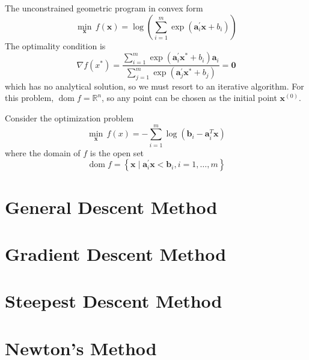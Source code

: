 \begin{example}
    The unconstrained geometric program in convex form
    \begin{equation*}
        \min_{\mathbf{x}}\,f(\mathbf{x})=\log \left(\sum_{i=1}^{m}\exp\left(\mathbf{a}_{i}^{\prime}\mathbf{x}+b_{i}\right)\right)
    \end{equation*}
    The optimality condition is
    \begin{equation*}
        \nabla f\left(x^{*}\right)=\frac{\sum_{i=1}^{m}\exp\left(\mathbf{a}_{i}^{\prime}\mathbf{x}^{*}+b_{i}\right)\mathbf{a}_{i}}{\sum_{j=1}^{m}\exp\left(\mathbf{a}_{j}^{\prime}\mathbf{x}^{*}+b_{j}\right)}=\mathbf{0}
    \end{equation*}
    which has no analytical solution, so we must resort to an iterative algorithm. For this problem, $\operatorname{dom} f=\mathbb{R}^{n}$, so any point can be chosen as the initial point $\mathbf{x}^{(0)}$.
\end{example}

\begin{example}
    Consider the optimization problem
    \begin{equation*}
        \min_{\mathbf{x}}\,f(x)=-\sum_{i=1}^{m}\log\left(\mathbf{b}_{i}-\mathbf{a}_{i}^{T}\mathbf{x}\right)
    \end{equation*}
    where the domain of $f$ is the open set
    \begin{equation*}
        \operatorname{dom}f=\left\{\mathbf{x}\mid\mathbf{a}_{i}^{\prime}\mathbf{x}<\mathbf{b}_{i},i=1,\ldots,m\right\}
    \end{equation*}
\end{example}

\begin{definition}

\end{definition}

\section{General Descent Method}

\section{Gradient Descent Method}

\section{Steepest Descent Method}

\section{Newton's Method}